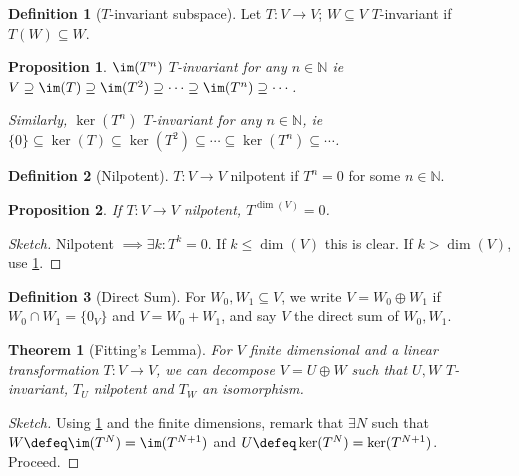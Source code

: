 \documentclass[12pt, oneside]{article}
\theoremstyle{definition}
\newtheorem{defn}{Definition}
\theoremstyle{plain}
\newtheorem{thm}{Theorem}
\newtheorem{prop}{Proposition}
\theoremstyle{remark}
\begin{document}
\begin{defn}[$T$-invariant subspace]
  Let $T : V \to V$; $W \subseteq V$ $T$-invariant if $T (W) \subseteq W$.
\end{defn}

\begin{prop}\label{prop:tinvariantchain}
$\im(T^n)$ $T$-invariant for any $n \in \mathbb{N}$ ie $V \supseteq \im(T) \supseteq \im(T^2) \supseteq \cdots \supseteq \im(T^n) \supseteq \cdots$. 

Similarly, $\ker(T^n)$ $T$-invariant for any $n \in \mathbb{N}$, ie $\{0\} \subseteq \ker(T) \subseteq \ker(T^2) \subseteq \cdots \subseteq \ker(T^n) \subseteq \cdots$.
\end{prop}

\begin{defn}[Nilpotent]
$T : V \to V$ nilpotent if $T^n = 0$ for some $n \in \mathbb{N}$.
\end{defn}
\begin{prop}
  If $T : V \to V$ nilpotent, $T^{\dim(V)} = 0$.
\end{prop}

\begin{proof}[Sketch]
  Nilpotent $\implies \exists k : T^k = 0$. If $k \leq \dim(V)$ this is clear. If $k > \dim(V)$, use \cref{prop:tinvariantchain}.
\end{proof}

\begin{defn}[Direct Sum]
  For $W_0, W_1 \subseteq V$, we write $V = W_0 \oplus W_1$ if $W_0 \cap W_1 = \{0_V\}$ and $V = W_0 + W_1$, and say $V$ the direct sum of $W_0, W_1$.
\end{defn}

\begin{thm}[Fitting's Lemma]
  For $V$ finite dimensional and a linear transformation $T : V \to V$, we can decompose $V = U \oplus W$ such that $U, W$ $T$-invariant, $T_U $ nilpotent and $T_W$ an isomorphism.
\end{thm}
\begin{proof}[Sketch]
  Using \cref{prop:tinvariantchain} and the finite dimensions, remark that $\exists N$ such that $W \defeq \im(T^N) = \im(T^{N+1})$ and $U \defeq \ker(T^{N}) = \ker(T^{N+1})$. Proceed.
\end{proof}
\end{document}
